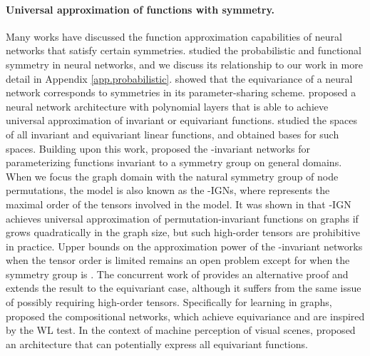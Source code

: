 \documentclass{article}
\begin{document}
\paragraph{Universal approximation of functions with symmetry.} Many works have discussed the function approximation capabilities of neural networks that satisfy certain symmetries.
\cite{bloemreddy2019probabilistic} studied the probabilistic and functional symmetry in neural networks, and we discuss its relationship to our work in more detail in Appendix \ref{app.probabilistic}. \cite{ravanbakhsh2017sharing} showed that the equivariance of a neural network corresponds to symmetries in its parameter-sharing scheme. \cite{yarotsky2018universal} proposed a neural network architecture with polynomial layers that is able to achieve universal approximation of invariant or equivariant functions.  
\cite{maron2018invariant} studied the spaces of all invariant and equivariant linear functions, and obtained bases for such spaces. Building upon this work, \cite{maron2019universality} proposed the -invariant networks for parameterizing functions invariant to a symmetry group  on general domains. When we focus the graph domain with the natural symmetry group of node permutations, the model is also known as the -IGNs, where  represents the maximal order of the tensors involved in the model. It was shown in \cite{maron2019universality} that -IGN achieves universal approximation of permutation-invariant functions on graphs if  grows quadratically in the graph size, but such high-order tensors are prohibitive in practice. Upper bounds on the approximation power of the -invariant networks when the tensor order is limited remains an open problem except for when the symmetry group is  \cite{maron2019universality}. The concurrent work of \cite{keriven2019universal} provides an alternative proof and extends the result to the equivariant case, although it suffers from the same issue of possibly requiring high-order tensors. Specifically for learning in graphs, \cite{kondor2018covariant} proposed the compositional networks, which achieve equivariance and are inspired by the WL test. In the context of machine perception of visual scenes, \cite{herzig2018mapping} proposed an architecture that can potentially express all equivariant functions.
\end{document}
